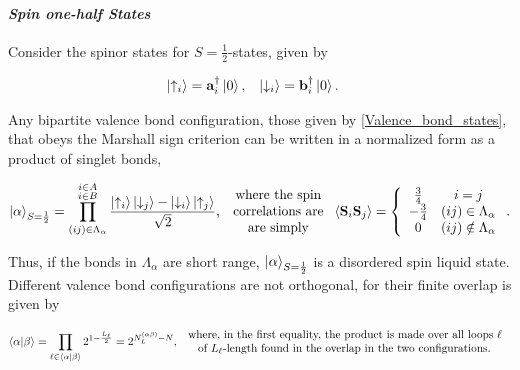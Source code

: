 \documentclass{homework}
\begin{document}
\paragraph{\textit{Spin one-half States}}

Consider the spinor states for $S = \frac{1}{2}$-states, given by 

\begin{align}
    \ket{\uparrow_i} &= {\bf a}_i^\dagger \ket{0}, & \ket{\downarrow_i} &= {\bf b}_i^\dagger  \ket{0}.
\end{align}

Any bipartite valence bond configuration, those given by \cref{Valence_bond_states}, that obeys the Marshall sign criterion can be written in a normalized form as a product of singlet bonds,

\begin{equation}
\begin{split}
    \ket{\alpha}_{S = \frac{1}{2}} = \prod_{(ij) \in \Lambda_{\alpha}}^{{\substack{{i \in A}\\
                                 {i \in B} }}}
    \frac{\ket{\uparrow_i}\ket{\downarrow_j}-\ket{\downarrow_i} \ket{\uparrow_j}}{\sqrt{2}},  \begin{array}{c}
         \textnormal{ where the spin }  \\
         \textnormal{ correlations are } \\
         \textnormal{ are simply } 
    \end{array} \langle {\bf S}_i {\bf S}_j \rangle = \left\{\begin{array}{cc}
         \frac{3}{4} & i = j  \\
         -\frac{3}{4} & (ij) \in \Lambda_{\alpha} \\
         0 & (ij) \notin \Lambda_{\alpha}
    \end{array}\right..
    \label{bipartite_valence_bond_states_corrs}
\end{split}
\end{equation}

Thus, if the bonds in $\Lambda_{\alpha}$ are short range, $\ket{\alpha}_{S=\frac{1}{2}}$ is a disordered spin liquid state. Different valence bond configurations are not orthogonal, for their finite overlap is given by 

\begin{equation}
    \bra{\alpha}\ket{\beta} = \prod_{\ell \in \bra{\alpha}\ket{\beta}} 2^{1- \frac{L_{\ell}}{2}} = 2^{N_{L}^{(\alpha \beta)} - N}, \begin{array}{c}
         \textnormal{ where, in the first equality, the product is made over all loops $\ell$  } \\
         \textnormal{ of $L_{\ell}$-length found in the overlap in the two configurations.  }
    \end{array} 
\end{equation}
\end{document}
